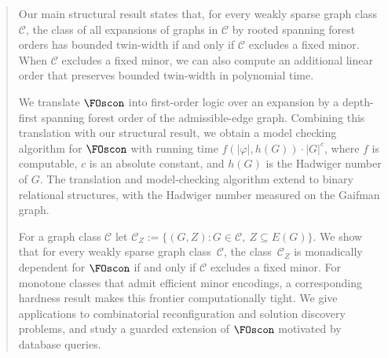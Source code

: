 \documentclass[1p,number,11pt]{elsarticle}
\renewcommand{\phi}{\varphi}
\theoremstyle{plain}
\newcommand{\Cc}{\mathscr{C}}
\begin{document}
\begin{frontmatter}
\begin{abstract}
Our main structural result states that, for every weakly sparse graph class $\Cc$, the class of all expansions of graphs in $\Cc$ by rooted spanning forest orders has bounded twin-width if and only if $\Cc$ excludes a fixed minor. When $\Cc$ excludes a fixed minor, we can also compute an additional linear order that preserves bounded twin-width in polynomial time.

We translate $\FOscon$ into first-order logic over an expansion by a depth-first spanning forest order of the admissible-edge graph. Combining this translation with our structural result, we obtain a model checking algorithm for $\FOscon$ with running time $f(|\phi|,h(G))\cdot |G|^c$, where $f$ is computable, $c$ is an absolute constant, and $h(G)$ is the Hadwiger number of $G$. The translation and model-checking algorithm extend to binary relational structures, with the Hadwiger number measured on the Gaifman graph.

For a graph class $\Cc$ let
$\Cc_Z:=\{(G,Z):G\in\Cc,\ Z\subseteq E(G)\}$. We show that for every weakly sparse graph class~$\Cc$, the class~$\Cc_Z$ is monadically dependent for $\FOscon$ if and only if $\Cc$ excludes a fixed minor. 
For monotone classes that admit efficient minor encodings, a corresponding hardness result makes this frontier computationally tight. 
We give applications to combinatorial reconfiguration and solution discovery problems, and study a guarded extension of $\FOscon$ motivated by database queries.%
\end{abstract}
\end{frontmatter}



\newpage 
\setcounter{tocdepth}{2}
\tableofcontents
\thispagestyle{empty}
\newpage
\setcounter{page}{1}
\end{document}

